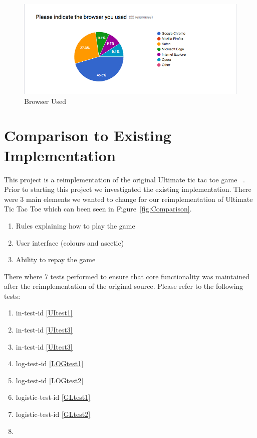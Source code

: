 \documentclass[12pt, titlepage]{article}
\newcommand{\UIref}[1]{in-test-id \ref{#1}}
\newcommand{\LOGref}[1]{log-test-id \ref{#1}}
\newcommand{\GLref}[1]{logistic-test-id \ref{#1}}
\begin{document}
\begin{itemize}
\begin{figure}[H]
\centering
\includegraphics[width=0.9\linewidth]{../../ReferenceMaterial/Survey_Results/Survey_Question_7}
\caption{Browser Used }
\end{figure}

\end{itemize}
\newpage
\section{Comparison to Existing Implementation}
This project is a reimplementation of the original Ultimate tic tac toe game ~\citep{githubREF}. Prior to starting this project we investigated the existing implementation. There were 3 main elements we wanted to change for our reimplementation of Ultimate Tic Tac Toe which can been seen in Figure~\ref{fig:Comparison}.

\begin{enumerate}
\item Rules explaining how to play the game
\item User interface (colours and ascetic)
\item Ability to repay the game
\end{enumerate}
There where 7 tests performed to ensure that core functionality was maintained after the reimplementation of the original source. Please refer to the following tests: 
\begin{multicols}{2}

\begin{enumerate}

\item \UIref{UItest1}
\item \UIref{UItest3}
\item \UIref{UItest3}
\item \LOGref{LOGtest1}
\item \LOGref{LOGtest2}
\item \GLref{GLtest1}
\item \GLref{GLtest2}
\item[] 

\end{enumerate}
\end{multicols}	
\end{document}
